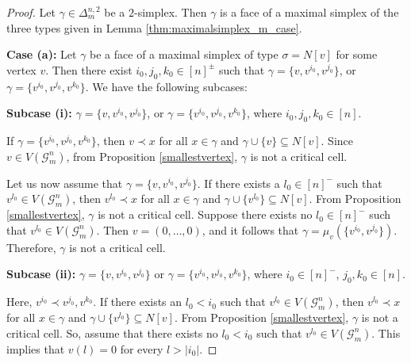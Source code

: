 \documentclass{amsart}
\theoremstyle{definition}
\theoremstyle{remark}
\numberwithin{equation}{section}
\newcommand{\G}{\mathcal{G}}
\begin{document}
\begin{proof}
	Let $\gamma \in \Delta_m^{n,2}$ be a $2$-simplex. Then $\gamma$ is a face of a maximal simplex of the three types given in Lemma \ref{thm:maximalsimplex_m_case}.
	
    \vspace{.1cm}
	\noindent\textbf{Case (a):} Let  $\gamma$ be a face of a maximal simplex of type $\sigma=N[v]$ for some vertex $v$. Then there exist $i_0, j_0, k_0 \in [n]^{\pm}$ such that   $\gamma=\{v,v^{i_0},v^{j_0}\}$, or $\gamma=\{v^{i_0},v^{j_0},v^{k_0}\}$. We have the following subcases:
	
	
    \vspace{.1cm}
	\noindent\textbf{Subcase (i):} $\gamma=\{v,v^{i_0},v^{j_0}\}$, or $\gamma=\{v^{i_0},v^{j_0},v^{k_0}\}$, where $i_0,j_0,k_0\in[n]$. 

    \smallskip
    
	\noindent If $\gamma=\{v^{i_0},v^{j_0},v^{k_0}\}$, then $v\prec x$ for all $x\in \gamma$  and $\gamma\cup \{v\} \subseteq N[v]$. Since $v \in V(\G_m^n)$, from Proposition \ref{smallestvertex}, $\gamma$  is not a critical cell.
    
    Let us now assume that $\gamma=\{v,v^{i_0},v^{j_0}\}$. If there exists a $l_0 \in [n]^{-}$ such that $v^{l_0} \in V(\mathcal{G}_m^n)$, then $v^{l_0}\prec x$ for all $x\in \gamma$ and $\gamma\cup \{v^{l_0}\} \subseteq N[v]$. From Proposition \ref{smallestvertex}, $\gamma$ is not a critical cell. 
	Suppose there exists no $l_0 \in [n]^{-}$ such that $v^{l_0} \in V(\mathcal{G}_m^n)$.  Then $v = (0, \ldots, 0)$, and it follows that $\gamma = \mu_{v}(\{v^{i_0}, v^{j_0}\})$. Therefore, $\gamma$ is not a critical cell. 
	
	
    \smallskip
    
	\noindent \textbf{Subcase (ii):} $\gamma=\{v,v^{i_0},v^{j_0}\}$ or $\gamma=\{v^{i_0},v^{j_0},v^{k_0}\}$, where  $i_0\in [n]^{-}$, $j_0,k_0\in [n]$.

    
    \smallskip
    
	\noindent 
	Here, $v^{i_0} \prec v^{j_0}, v^{k_0}$.
	If there exists an $l_0 < i_0$ such that $v^{l_0} \in V(\mathcal{G}_m^n)$, then  $v^{l_0} \prec x$ for all $x\in\gamma$ and $\gamma\cup \{v^{l_0}\} \subseteq N[v]$. From Proposition \ref{smallestvertex}, $\gamma$ is not a critical cell. So, assume that there exists no $l_0 < i_0$ such that $v^{l_0} \in V(\mathcal{G}_m^n)$. This implies that $v(l)=0$ for every $l>|i_0|$.
	

\end{proof}
\end{document}
